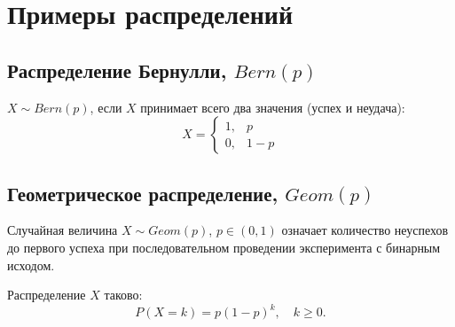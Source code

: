\documentclass[a4paper,12pt]{article}
\renewcommand{\ge}{\geqslant}
\begin{document}
\newpage
\section*{Примеры распределений} 
\subsection*{Распределение Бернулли, $Bern(p)$} 
$X \sim Bern(p)$, если $X$ принимает всего два значения (успех и неудача):
\[
X =
    \begin{cases}
        1, & p\\
        0, &1-p
    \end{cases}
\]

\subsection*{Геометрическое распределение, $Geom(p)$} 
Случайная величина $X \sim Geom(p)$, $p \in (0,1)$ означает количество неуспехов до первого успеха при последовательном проведении эксперимента с бинарным исходом.

Распределение $X$ таково:
$$P(X=k) = p (1-p)^k, \quad k \ge 0.$$
\end{document}
